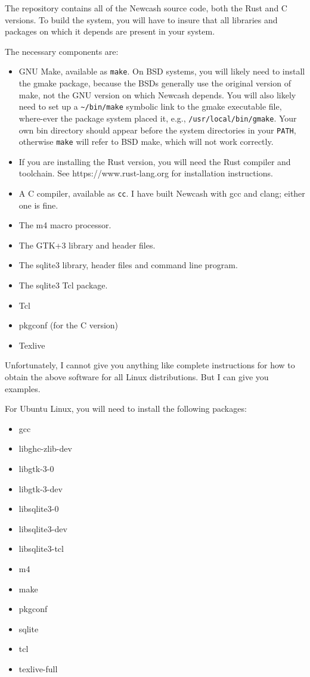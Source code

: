 \documentclass{report}
\begin{document}
The repository contains all of the Newcash source code, both the Rust and C versions. To build the system, you will have to insure that all libraries and packages on which it depends are present in your system. 

The necessary components are:
\begin{itemize}
\item GNU Make, available as \verb|make|. On BSD systems, you will likely need to install the gmake package, because the BSDs generally use the original version of make, not the GNU version on which Newcash depends.
You will also likely need to set up a \verb|~/bin/make| symbolic link to the gmake executable file, where-ever the package system placed it, e.g., \verb|/usr/local/bin/gmake|.
Your own bin directory should appear before the system directories in your \verb|PATH|, 
otherwise \verb|make| will refer to BSD make, which will not work correctly.
\item If you are installing the Rust version, you will need the Rust compiler and toolchain. See https://www.rust-lang.org for installation instructions. 
\item A C compiler, available as \verb|cc|. I have built Newcash with gcc and clang; either one is fine.
\item The m4 macro processor.
\item The GTK+3 library and header files.
\item The sqlite3 library, header files and command line program.
\item The sqlite3 Tcl package.
\item Tcl
\item pkgconf (for the C version)
\item Texlive
\end{itemize}

Unfortunately, I cannot give you anything like complete instructions for how to obtain the above software for all Linux distributions. But I can give you examples. 

For Ubuntu Linux, you will need to install the following packages:
\begin{itemize}
\item gcc
\item libghc-zlib-dev
\item libgtk-3-0
\item libgtk-3-dev
\item libsqlite3-0
\item libsqlite3-dev
\item libsqlite3-tcl
\item m4
\item make
\item pkgconf
\item sqlite
\item tcl
\item texlive-full
\end{itemize}
\end{document}
